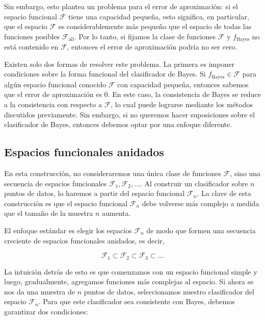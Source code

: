 \documentclass{report}
\begin{document}
Sin embargo, esto plantea un problema para el error de aproximación: si el espacio funcional 
\(\mathcal{F}\) tiene una capacidad pequeña, esto significa, en particular, que el espacio 
\(\mathcal{F}\) es considerablemente más pequeño que el espacio de todas las funciones posibles 
\(\mathcal{F}_{\text{all}}\). Por lo tanto, si fijamos la clase de funciones \(\mathcal{F}\) y 
\(f_{\text{Bayes}}\) no está contenido en \(\mathcal{F}\), entonces el 
error de aproximación podría no ser cero.\newline

Existen solo dos formas de resolver este problema. La primera es imponer condiciones sobre la 
forma funcional del clasificador de Bayes. Si \(f_{\text{Bayes}} \in \mathcal{F}\) para algún 
espacio funcional conocido \(\mathcal{F}\) con capacidad pequeña, entonces sabemos que el error 
de aproximación es \(0\). En este caso, la consistencia de Bayes se reduce a la consistencia con 
respecto a \(\mathcal{F}\), lo cual puede lograrse mediante los métodos discutidos previamente. 
Sin embargo, si no queremos hacer suposiciones sobre el clasificador de Bayes, entonces 
debemos optar por una enfoque diferente.\newline

\subsection{Espacios funcionales anidados}

En esta construcción, no consideraremos una única clase de funciones \(\mathcal{F}\), sino una 
secuencia de espacios funcionales \(\mathcal{F}_1, \mathcal{F}_2, \dots\). Al construir un 
clasificador sobre \(n\) puntos de datos, lo haremos a partir del espacio funcional \(\mathcal{F}_n\). 
La clave de esta construcción es que el espacio funcional \(\mathcal{F}_n\) debe volverse más 
complejo a medida que el tamaño de la muestra \(n\) aumenta.\newline

El enfoque estándar es elegir los espacios \(\mathcal{F}_n\) de modo que formen una secuencia 
creciente de espacios funcionales anidados, es decir,

\[
\mathcal{F}_1 \subset \mathcal{F}_2 \subset \mathcal{F}_3 \subset \dots
\]

La intuición detrás de esto es que comenzamos con un espacio funcional simple y luego, 
gradualmente, agregamos funciones más complejas al espacio. Si ahora se nos da una muestra 
de \(n\) puntos de datos, seleccionamos nuestro clasificador del espacio \(\mathcal{F}_n\). 
Para que este clasificador sea consistente con Bayes, debemos garantizar dos condiciones:\newline
\end{document}
